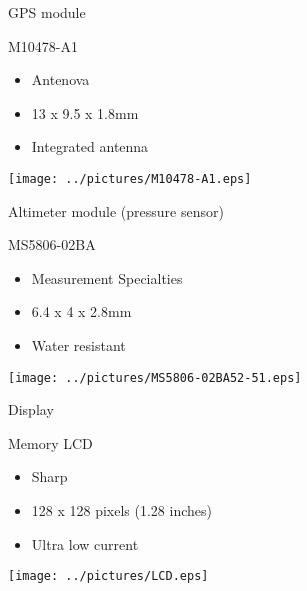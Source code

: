 \documentclass[compress,red]{beamer}
\begin{document}
\begin{frame}{GPS module}

  \begin{block}{M10478-A1}
    \begin{itemize}
    \item Antenova
    \item 13 x 9.5 x 1.8mm
    \item Integrated antenna
    \end{itemize}
  \end{block}

  \begin{center}
    \texttt{[image: ../pictures/M10478-A1.eps]}
  \end{center}

  \note[item]{}

\end{frame}

\begin{frame}{Altimeter module (pressure sensor)}

  \begin{block}{MS5806-02BA}
    \begin{itemize}
    \item Measurement Specialties
    \item 6.4 x 4 x 2.8mm
    \item Water resistant
    \end{itemize}
  \end{block}

  \begin{center}
    \texttt{[image: ../pictures/MS5806-02BA52-51.eps]}
  \end{center}

  \note[item]{}

\end{frame}

\begin{frame}{Display}

  \begin{block}{Memory LCD}
    \begin{itemize}
    \item Sharp
    \item 128 x 128 pixels (1.28 inches)
    \item Ultra low current
    \end{itemize}
  \end{block}


  \begin{center}
    \texttt{[image: ../pictures/LCD.eps]}
  \end{center}

  \note[item]{}

\end{frame}
\end{document}
